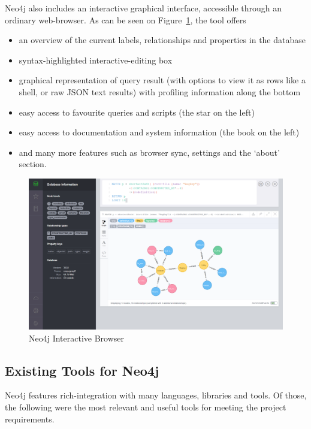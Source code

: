 Neo4j also includes an interactive graphical interface, accessible through an
ordinary web-browser. As can be seen on Figure~\ref{fig:neo4jbrowser}, the tool
offers 
\begin{itemize}
  \item an overview of the current labels, relationships and properties in the
        database
  \item syntax-highlighted interactive-editing box
  \item graphical representation of query result (with options to view it as
        rows like a shell, or raw JSON text results) with profiling information
        along the bottom
  \item easy access to favourite queries and scripts (the star on the left)
  \item easy access to documentation and system information (the book on the
        left)
  \item and many more features such as browser sync, settings and the `about'
        section.
\end{itemize}

\begin{figure}[tbp]

\includegraphics[width=\textwidth]{img/Neo4j_Browser.png}
\caption{Neo4j Interactive Browser}\label{fig:neo4jbrowser}

\end{figure}

\subsection{Existing Tools for Neo4j}\label{subsec:existtoolsneo4j}

Neo4j features rich-integration with many languages, libraries and tools.
Of those, the following were the most relevant and useful tools for meeting
the project requirements.

